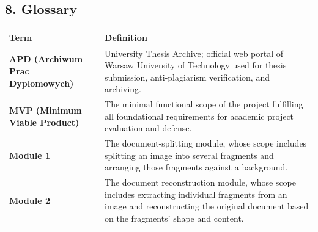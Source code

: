 \documentclass[
]{article}
\newcounter{none} %
\begin{document}
\subsection{8. Glossary}\label{glossary}

{\def\LTcaptype{none} %
\begin{longtable}[]{@{}
  >{\raggedright\arraybackslash}p{}
  >{\raggedright\arraybackslash}p{}@{}}
\toprule\noalign{}
\begin{minipage}[b]{\linewidth}\raggedright
Term
\end{minipage} & \begin{minipage}[b]{\linewidth}\raggedright
Definition
\end{minipage} \\
\midrule\noalign{}
\endhead
\bottomrule\noalign{}
\endlastfoot
\textbf{APD (Archiwum Prac Dyplomowych)} & University Thesis Archive;
official web portal of Warsaw University of Technology used for thesis
submission, anti-plagiarism verification, and archiving. \\
\textbf{MVP (Minimum Viable Product)} & The minimal functional scope of
the project fulfilling all foundational requirements for academic
project evaluation and defense. \\
\textbf{Module 1} & The document-splitting module, whose scope includes
splitting an image into several fragments and arranging those fragments
against a background. \\
\textbf{Module 2} & The document reconstruction module, whose scope
includes extracting individual fragments from an image and
reconstructing the original document based on the fragments' shape and
content. \\
\end{longtable}
}
\end{document}
